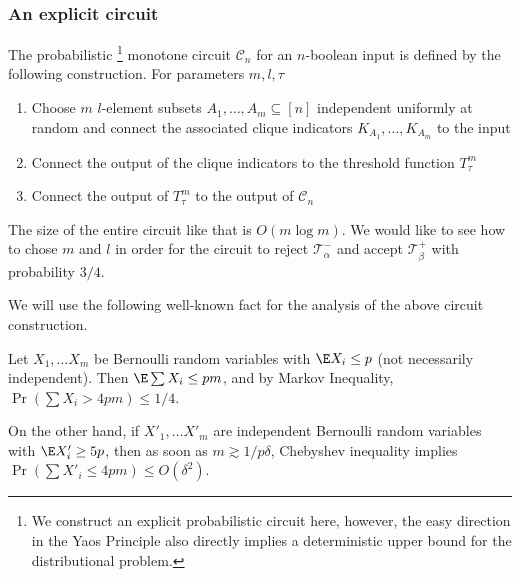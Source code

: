 \subsubsection*{An explicit circuit}
The probabilistic \footnote{ We construct an explicit probabilistic circuit here, however, the easy direction in the Yaos Principle \cite{yao1977probabilistic} also directly implies a deterministic upper bound for the distributional problem.} monotone circuit $\mathcal{C}_n$ for an $n$-boolean input is defined by the following construction. For parameters $m, l, \tau$
\begin{enumerate}
    \item Choose $m$ $l$-element subsets $A_1, \dots, A_m \subseteq [n]$ independent uniformly at random and connect the associated clique indicators $K_{A_1}, \dots, K_{A_m}$ to the input 
    \item Connect the output of the clique indicators to the threshold function $T_\tau^m$
    \item Connect the output of $T_\tau^m$ to the output of $\mathcal{C}_n$
\end{enumerate}

The size of the entire circuit like that is $O(m\log m)$. We would like to see how to chose $m$ and $l$ in order for the circuit to reject $\mathcal{T}^-_{\alpha}$ and accept $\mathcal{T}^+_{\beta}$ with probability $3/4$.

We will use the following well-known fact for the analysis of the above circuit construction.



\begin{fact}
\label{fact:distinguish}
Let $X_1, \ldots X_m$ be Bernoulli random variables with $\E X_i \leq p$ (not necessarily independent). Then $\E \sum X_i \leq pm$, and by Markov Inequality, $\Pr(\sum X_i > 4 pm) \leq 1/4$.

On the other hand, if $X'_1, \ldots X'_m$ are independent  Bernoulli random variables with $\E X'_i \geq 5p$, then  as soon as $m \gtrsim 1/p\delta$, Chebyshev inequality implies $\Pr(\sum X'_i \leq 4 pm) \leq O(\delta^2).$
\end{fact}

